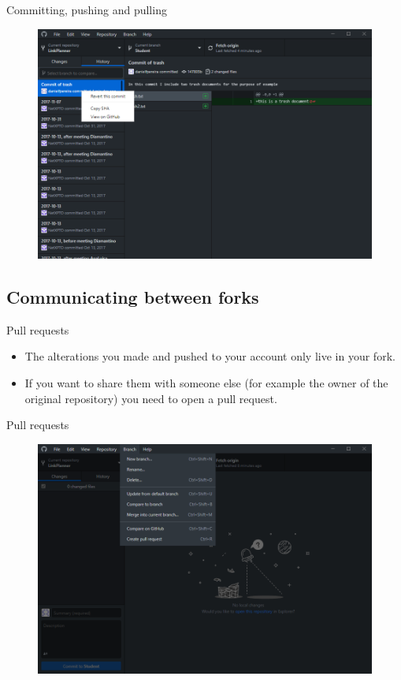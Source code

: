 \documentclass[usenames,dvipsnames,aspectratio=169]{beamer}
\newcommand{\aitem}{\item[$\cdot$]}
\begin{document}
\begin{frame}[t]{Committing, pushing and pulling}
\begin{figure}
\centering
\includegraphics[width=.7\linewidth]{reverting1}
\end{figure}
\end{frame}


\subsection{Communicating between forks}
\begin{frame}[t]{Pull requests}
\begin{itemize}
\aitem The alterations you made and pushed to your account only live in your fork.
\aitem If you want to share them with someone else (for example the owner of the original repository) you need to open a pull request.
\end{itemize}
\end{frame}


\begin{frame}[t]{Pull requests}
\begin{figure}
\centering
\includegraphics[width=.7\linewidth]{pullrequest1}
\end{figure}
\end{frame}
\end{document}
